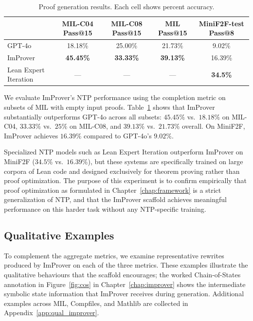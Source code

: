 \begin{table}[th]
\caption{Proof generation results. Each cell shows percent accuracy.}
\label{tab:comp}
\centering
\small
\begin{tabular}{l|ccc|c}
\toprule
& MIL-C04 Pass@15 & MIL-C08 Pass@15 & MIL Pass@15 & MiniF2F-test Pass@8\\
\midrule
GPT-4o     & 18.18\% & 25.00\% & 21.73\% & 9.02\%\\
ImProver   & \textbf{45.45\%} & \textbf{33.33\%} & \textbf{39.13\%} & 16.39\%\\
Lean Expert Iteration & --- & --- & --- & \textbf{34.5\%}\\
\bottomrule
\end{tabular}
\end{table}

We evaluate ImProver's NTP performance using the completion metric on subsets of MIL with empty input proofs. Table~\ref{tab:comp} shows that ImProver substantially outperforms GPT-4o across all subsets: $45.45\%$ vs.\ $18.18\%$ on MIL-C04, $33.33\%$ vs.\ $25\%$ on MIL-C08, and $39.13\%$ vs.\ $21.73\%$ overall. On MiniF2F, ImProver achieves $16.39\%$ compared to GPT-4o's $9.02\%$.

Specialized NTP models such as Lean Expert Iteration \cite{DBLP:journals/corr/abs-2202-01344} outperform ImProver on MiniF2F ($34.5\%$ vs.\ $16.39\%$), but these systems are specifically trained on large corpora of Lean code and designed exclusively for theorem proving rather than proof optimization. The purpose of this experiment is to confirm empirically that proof optimization as formulated in Chapter~\ref{chap:framework} is a strict generalization of NTP, and that the ImProver scaffold achieves meaningful performance on this harder task without any NTP-specific training.



\subsection{Qualitative Examples}
\label{sec:qual_ex}

To complement the aggregate metrics, we examine representative rewrites produced by ImProver on each of the three metrics. These examples illustrate the qualitative behaviours that the scaffold encourages; the worked Chain-of-States annotation in Figure~\ref{fig:cos} in Chapter~\ref{chap:improver} shows the intermediate symbolic state information that ImProver receives during generation. Additional examples across MIL, Compfiles, and Mathlib are collected in Appendix~\ref{app:qual_improver}.

